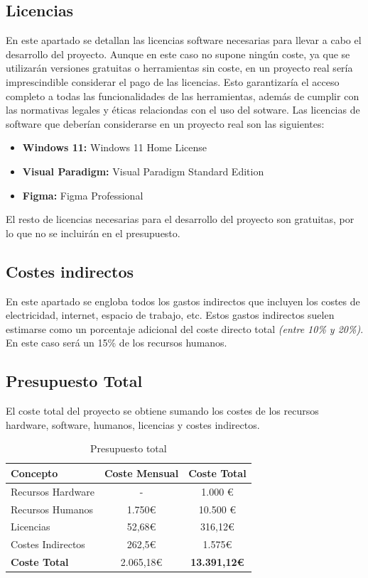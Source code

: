 \subsection{Licencias}
En este apartado se detallan las licencias software necesarias para llevar a cabo el desarrollo del proyecto. Aunque en este caso no supone ningún coste, 
ya que se utilizarán versiones gratuitas o herramientas sin coste, en un proyecto real sería imprescindible considerar el pago de las licencias. Esto garantizaría 
el acceso completo a todas las funcionalidades de las herramientas, además de cumplir con las normativas legales y éticas relaciondas con el uso del sotware. Las licencias de software que deberían considerarse en un proyecto real 
son las siguientes: 
\begin{itemize}
    \item \textbf{Windows 11:} Windows 11 Home License
    \item \textbf{Visual Paradigm:} Visual Paradigm Standard Edition
    \item \textbf{Figma:} Figma Professional
\end{itemize}

El resto de licencias necesarias para el desarrollo del proyecto son gratuitas, por lo que no se incluirán en el presupuesto.


\subsection{Costes indirectos}
En este apartado se engloba todos los gastos indirectos que incluyen los costes de electricidad, internet, espacio de trabajo, etc. 
Estos gastos indirectos suelen estimarse como un porcentaje adicional del coste directo total \textit{(entre 10\% y 20\%)}.
En este caso será un 15\% de los recursos humanos.

\subsection{Presupuesto Total}
El coste total del proyecto se obtiene sumando los costes de los recursos hardware, software, humanos, licencias y costes indirectos.

\begin{table}[H]
    \centering
    \begin{tabular}{|l|c|c|}
        \hline
        \textbf{Concepto} & \textbf{Coste Mensual} & \textbf{Coste Total} \\ \hline
        Recursos Hardware & - & 1.000 \euro \\ \hline
        Recursos Humanos & 1.750\euro & 10.500 \euro \\ \hline
        Licencias & 52,68\euro & 316,12\euro \\ \hline
        Costes Indirectos & 262,5\euro & 1.575\euro \\ \hline
        \textbf{Coste Total} & 2.065,18\euro & \textbf{13.391,12\euro} \\ \hline
    \end{tabular}
    \caption{Presupuesto total}
    
\end{table}



\newpage